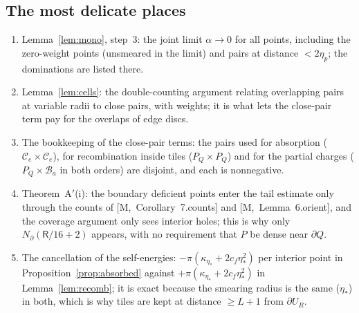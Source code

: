 \documentclass[11pt,reqno]{amsart}
\numberwithin{equation}{section}
\theoremstyle{plain}
\theoremstyle{definition}
\newcommand{\fR}{\mathsf{R}}
\newcommand{\ms}[1]{\textup{[M,~#1]}}
\begin{document}
\subsection{The most delicate places}
\begin{enumerate}[leftmargin=*]
\item Lemma~\ref{lem:mono}, step~3: the joint limit $\alpha\to0$ for all points, including the zero-weight points (unsmeared in the limit) and pairs at distance $<2\eta_p$; the dominations are listed there.
\item Lemma~\ref{lem:cells}: the double-counting argument relating overlapping pairs at variable radii to close pairs, with weights; it is what lets the close-pair term pay for the overlaps of edge discs.
\item The bookkeeping of the close-pair terms: the pairs used for absorption ($\mathcal C_e\times\mathcal C_e$), for recombination inside tiles ($P_Q\times P_Q$) and for the partial charges ($P_Q\times\mathcal B_a$ in both orders) are disjoint, and each is nonnegative.
\item Theorem~A$'$(i): the boundary deficient points enter the tail estimate only through the counts of \ms{Corollary~7.counts} and \ms{Lemma~6.orient}, and the coverage argument only sees interior holes; this is why only $N_\partial(\fR/16+2)$ appears, with no requirement that $P$ be dense near $\partial Q$.
\item The cancellation of the self-energies: $-\pi(\kappa_{\eta_*}+2c_f\eta_*^2)$ per interior point in Proposition~\ref{prop:absorbed} against $+\pi(\kappa_{\eta_*}+2c_f\eta_*^2)$ in Lemma~\ref{lem:recomb}; it is exact because the smearing radius is the same ($\eta_*$) in both, which is why tiles are kept at distance $\ge L+1$ from $\partial U_R$.
\end{enumerate}
\end{document}
